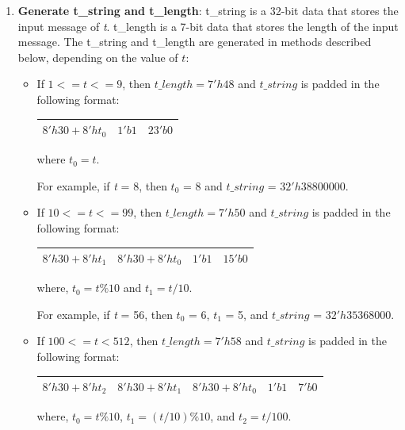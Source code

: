 \documentclass[main\_\_EN.tex]{subfiles}
\begin{document}
\begin{enumerate}\label{others:sha-512/t}
    \item \textbf{Generate t\_string and t\_length}: t\_string is a 32-bit data that stores the input message of {\it{t}}. t\_length is a 7-bit data that stores the length of the input message. The t\_string and t\_length are generated in methods described below, depending on the value of \begin{math}t\end{math}:

    \begin{itemize}
        \item If $1<=t<=9$, then $t\_length=7'h48$ and $t\_string$ is padded in the following format:\\
        \begin{longtable}[c]{|l|l|l|}
        \hline
        $8'h30+8'ht_0$ & $1'b1$ & $23'b0$\\
        \hline
        \end{longtable}
        where $t_0=t$.
        
        For example, if {\it{t}} = 8, then $t_0$ = 8 and $t\_string$ = $32'h38800000$. 

        \item If $10<=t<=99$, then $t\_length=7'h50$ and $t\_string$ is padded in the following format:\\
        
        \begin{longtable}[c]{|l|l|l|l|}
        \hline
        $8'h30+8'ht_1$ & $8'h30+8'ht_0$ & $1'b1$ & $15'b0$\\
        \hline
        \end{longtable}
        where, $t_0=t\%10$ and $t_1=t/10$.
        
        For example, if {\it{t}} = 56, then $t_0$ = 6, $t_1$ = 5, and $t\_string$ = $32'h35368000$.
        
        \item If $100<=t<512$, then $t\_length=7'h58$ and $t\_string$ is padded in the following format:\\
        
        \begin{longtable}[c]{|l|l|l|l|l|}
        \hline
        $8'h30+8'ht_2$ & $8'h30+8'ht_1$ & $8'h30+8'ht_0$ & $1'b1$ & $7'b0$\\
        \hline
        \end{longtable}
        where, $t_0=t\%10$, $t_1=(t/10)\%10$, and $t_2=t/100$.
        

\end{itemize}
\end{enumerate}
\end{document}
